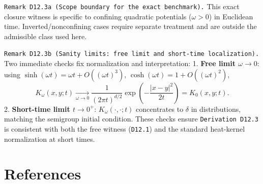 \documentclass[
]{article}
\begin{document}
\texttt{Remark\ D12.3a\ (Scope\ boundary\ for\ the\ exact\ benchmark).}
This exact closure witness is specific to confining quadratic potentials
(\(\omega>0\)) in Euclidean time. Inverted/nonconfining cases require
separate treatment and are outside the admissible class used here.

\texttt{Remark\ D12.3b\ (Sanity\ limits:\ free\ limit\ and\ short-time\ localization).}
Two immediate checks fix normalization and interpretation: 1.
\textbf{Free limit \(\omega\to0\)}: using
\(\sinh(\omega t)=\omega t+O((\omega t)^3)\),
\(\cosh(\omega t)=1+O((\omega t)^2)\), \[
K_\omega(x,y;t)\xrightarrow[\omega\to0]{}
\frac{1}{(2\pi t)^{d/2}}\exp\!\left(-\frac{|x-y|^2}{2t}\right)
=K_0(x,y;t).
\] 2. \textbf{Short-time limit \(t\to0^+\)}: \(K_\omega(\cdot,\cdot;t)\)
concentrates to \(\delta\) in distributions, matching the semigroup
initial condition. These checks ensure \texttt{Derivation\ D12.3} is
consistent with both the free witness (\texttt{D12.1}) and the standard
heat-kernel normalization at short times.

\section{References}\label{references}
\end{document}
